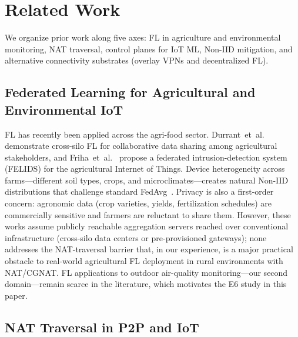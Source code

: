 ﻿\documentclass[journal]{IEEEtran}
\begin{document}
\section{Related Work}
\label{sec:related}

We organize prior work along five axes: FL in agriculture and environmental monitoring, NAT traversal, control planes for IoT ML, Non-IID mitigation, and alternative connectivity substrates (overlay VPNs and decentralized FL).

\subsection{Federated Learning for Agricultural and Environmental IoT}

FL has recently been applied across the agri-food sector. Durrant~et~al.~\cite{durrant2022} demonstrate cross-silo FL for collaborative data sharing among agricultural stakeholders, and Friha~et~al.~\cite{friha2022} propose a federated intrusion-detection system (FELIDS) for the agricultural Internet of Things. Device heterogeneity across farms---different soil types, crops, and microclimates---creates natural Non-IID distributions that challenge standard FedAvg~\cite{mcmahan2017}. Privacy is also a first-order concern: agronomic data (crop varieties, yields, fertilization schedules) are commercially sensitive and farmers are reluctant to share them. However, these works assume publicly reachable aggregation servers reached over conventional infrastructure (cross-silo data centers or pre-provisioned gateways); none addresses the NAT-traversal barrier that, in our experience, is a major practical obstacle to real-world agricultural FL deployment in rural environments with NAT/CGNAT. FL applications to outdoor air-quality monitoring---our second domain---remain scarce in the literature, which motivates the E6 study in this paper.

\subsection{NAT Traversal in P2P and IoT}
\end{document}
